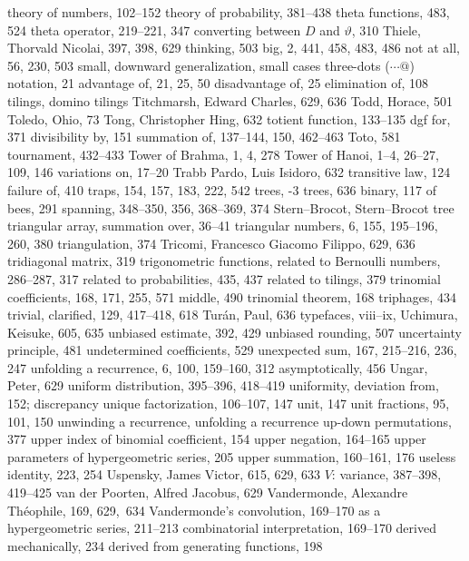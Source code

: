 theory of numbers, 102--152
theory of probability, 381--438
theta functions, 483, 524
theta operator, 219--221, 347
\sub converting between $D$ and $\vartheta$, 310
Thiele, Thorvald Nicolai, 397, 398, 629
thinking, 503
\sub big, 2, 441, 458, 483, 486
\sub not at all, 56, 230, 503
\sub small, \see downward generalization, small cases
three-dots ($\cdots@$) notation, 21
\sub advantage of, 21, 25, 50
\sub disadvantage of, 25
\sub elimination of, 108
tilings, \see domino tilings
Titchmarsh, Edward Charles, 629, 636
Todd, Horace, 501
Toledo, Ohio, 73
Tong, Christopher Hing, 632
totient function, 133--135
\sub dgf for, 371
\sub divisibility by, 151
\sub summation of, 137--144, 150, 462--463
Toto, 581
tournament, 432--433
Tower of Brahma, 1, 4, 278
Tower of Hanoi, 1--4, 26--27, 109, 146
\sub variations on, 17--20
Trabb Pardo, Luis Isidoro, 632
transitive law, 124
\sub failure of, 410
traps, 154, 157, 183, 222, 542
trees,
-3 trees, 636
\sub binary, 117
\sub of bees, 291
\sub spanning, 348--350, 356, 368--369, 374
\sub Stern--Brocot, \see Stern--Brocot tree
triangular array, summation over, 36--41
triangular numbers, 6, 155, 195--196, 260, 380
triangulation, 374
Tricomi, Francesco Giacomo Filippo, 629, 636
tridiagonal matrix, 319
trigonometric functions,
\sub related to Bernoulli numbers, 286--287, 317
\sub related to probabilities, 435, 437
\sub related to tilings, 379
trinomial coefficients, 168, 171, 255, 571
\sub middle, 490
trinomial theorem, 168
triphages, 434
trivial, clarified, 129, 417--418, 618
Tur\'an, Paul, 636
typefaces, viii--ix, \cpage
\medskip
Uchimura, Keisuke, 605, 635
unbiased estimate, 392, 429
unbiased rounding, 507
uncertainty principle, 481
undetermined coefficients, 529
unexpected sum, 167, 215--216, 236, 247
unfolding a recurrence, 6, 100, 159--160, 312
\sub asymptotically, 456
Ungar, Peter, 629
uniform distribution, 395--396, 418--419
uniformity, deviation from, 152; \also discrepancy
unique factorization, 106--107, 147
unit, 147
unit fractions, 95, 101, 150
unwinding a recurrence, \see unfolding a recurrence
up-down permutations, 377
upper index of binomial coefficient, 154
upper negation, 164--165
upper parameters of hypergeometric series, 205
upper summation, 160--161, 176
useless identity, 223, 254
Uspensky, James Victor, 615, 629, 633
\medskip
$V$: variance, 387--398, 419--425
van der Poorten, Alfred Jacobus, 629
Vandermonde, Alexandre Th\'eophile, 169, 629,~634\kern-6pt
Vandermonde's convolution, 169--170
\sub as a hypergeometric series, 211--213
\sub combinatorial interpretation, 169--170
\sub derived mechanically, 234
\sub derived from generating functions, 198
